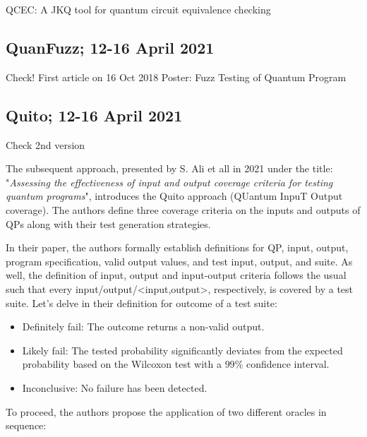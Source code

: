\begin{itemize}
QCEC: A JKQ tool for quantum circuit equivalence checking 

\vspace{15pt}
\subsection{QuanFuzz; 12-16 April 2021}

Check! First article on 16 Oct 2018 \cite{wang2018quanfuzz}
Poster: Fuzz Testing of Quantum Program 
 \cite{wang2021poster}

\vspace{15pt}
\subsection{Quito; 12-16 April 2021}
\label{Ch3.2.2:Quito}

Check 2nd version \cite{wang2021quito}

 The subsequent approach, presented by S. Ali et all in 2021 under the title: "\textit{Assessing the effectiveness of input and output coverage criteria for testing quantum programs}"\cite{ali2021assessing}, introduces the Quito approach (QUantum InpuT Output coverage). The authors define three coverage criteria on the inputs and outputs of QPs along with their test generation strategies.\newline

In their paper, the authors formally establish definitions for QP, input, output, program specification, valid output values, and test input, output, and suite. As well, the definition of input, output and input-output criteria follows the usual such that every input/output/<input,output>, respectively,  is covered by a test suite. Let's delve in their definition for outcome of a test suite:

\vspace{8pt}
\begin{itemize}
    \item Definitely fail: The outcome returns a non-valid output.
    \item Likely fail: The tested probability significantly deviates from the expected probability based on the Wilcoxon test with a $99\%$ confidence interval.
    \item Inconclusive: No failure has been detected.
\end{itemize}

To proceed, the authors propose the application of two different oracles in sequence:


\end{itemize}

